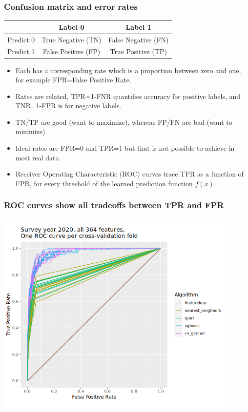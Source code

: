 \documentclass{beamer}
\begin{document}
\begin{frame}
  \frametitle{Confusion matrix and error rates}
  \begin{tabular}{c|c|c}
    & Label 0            & Label 1 \\
    \hline
    Predict 0 & True Negative (TN) & False Negative (FN) \\
    \hline
    Predict 1 & False Positive (FP)& True Positive (TP)
  \end{tabular}
  \begin{itemize}
  \item Each has a corresponding rate which is a proportion between
    zero and one, for example FPR=False Positive Rate.
  \item Rates are related, TPR=1-FNR quantifies accuracy for positive
    labels, and TNR=1-FPR is for negative labels.
  \item TN/TP are good (want to maximize), whereas FP/FN are bad (want
    to minimize).
  \item Ideal rates are FPR=0 and TPR=1 but that is not possible to
    achieve in most real data.
  \item Receiver Operating Characteristic (ROC) curves trace TPR as a
    function of FPR, for every threshold of the learned prediction
    function $f(x)$.
  \end{itemize}
\end{frame}

\begin{frame}
  \frametitle{ROC curves show all tradeoffs between TPR and FPR}
  \includegraphics[width=0.9\textwidth]{download-nsch-mlr3batchmark-registry-one-set-all-features-roc.png}
\end{frame}
\end{document}
